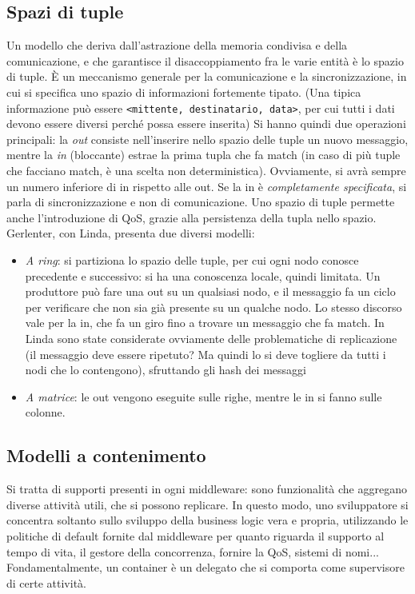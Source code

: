 \subsection{Spazi di tuple}
Un modello che deriva dall'astrazione della memoria condivisa e della comunicazione, e che garantisce il
disaccoppiamento fra le varie entità è lo spazio di tuple. È un meccanismo generale per la comunicazione e la
sincronizzazione, in cui si specifica uno spazio di informazioni fortemente tipato. (Una tipica informazione può essere
\texttt{<mittente, destinatario, data>}, per cui tutti i dati devono essere diversi perché possa essere inserita)
Si hanno quindi due operazioni principali: la \textit{out} consiste nell'inserire nello spazio delle tuple un nuovo
messaggio, mentre la \textit{in} (bloccante) estrae la prima tupla che fa match (in caso di più tuple che facciano
match, è una scelta non deterministica). Ovviamente, si avrà sempre un numero inferiore di in rispetto alle out. Se 
la in è \textit{completamente specificata}, si parla di sincronizzazione e non di comunicazione. Uno spazio di tuple
permette anche l'introduzione di QoS, grazie alla persistenza della tupla nello spazio.
Gerlenter, con Linda, presenta due diversi modelli:
\begin{itemize}
 \item \textit{A ring}: si partiziona lo spazio delle tuple, per cui ogni nodo conosce precedente e successivo: si ha
 una conoscenza locale, quindi limitata. Un produttore può fare una out su un qualsiasi nodo, e il messaggio fa un
 ciclo per verificare che non sia già presente su un qualche nodo. Lo stesso discorso vale per la in, che fa un giro
 fino a trovare un messaggio che fa match. In Linda sono state considerate ovviamente delle problematiche di
 replicazione (il messaggio deve essere ripetuto? Ma quindi lo si deve togliere da tutti i nodi che lo contengono),
 sfruttando gli hash dei messaggi 
 \item \textit{A matrice}: le out vengono eseguite sulle righe, mentre le in si fanno sulle colonne.
\end{itemize}
\subsection{Modelli a contenimento}
Si tratta di supporti presenti in ogni middleware: sono funzionalità che aggregano diverse attività utili, che si
possono replicare. In questo modo, uno sviluppatore si concentra soltanto sullo sviluppo della business logic vera e
propria, utilizzando le politiche di default fornite dal middleware per quanto riguarda il supporto al tempo di vita,
il gestore della concorrenza, fornire la QoS, sistemi di nomi... Fondamentalmente, un container è un delegato che si
comporta come supervisore di certe attività.
